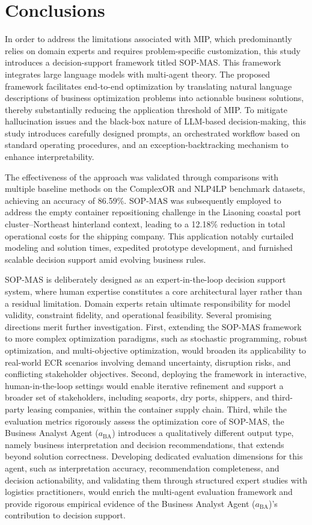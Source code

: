 \documentclass[preprint,12pt]{elsarticle}
\begin{document}
\section{Conclusions}

In order to address the limitations associated with MIP, which predominantly relies on domain experts and requires problem-specific customization, this study introduces a decision-support framework titled SOP-MAS. This framework integrates large language models with multi-agent theory. The proposed framework facilitates end-to-end optimization by translating natural language descriptions of business optimization problems into actionable business solutions, thereby substantially reducing the application threshold of MIP. To mitigate hallucination issues and the black-box nature of LLM-based decision-making, this study introduces carefully designed prompts, an orchestrated workflow based on standard operating procedures, and an exception-backtracking mechanism to enhance interpretability.

The effectiveness of the approach was validated through comparisons with multiple baseline methods on the ComplexOR and NLP4LP benchmark datasets, achieving an accuracy of 86.59\%. SOP-MAS was subsequently employed to address the empty container repositioning challenge in the Liaoning coastal port cluster–Northeast hinterland context, leading to a 12.18\% reduction in total operational costs for the shipping company. This application notably curtailed modeling and solution times, expedited prototype development, and furnished scalable decision support amid evolving business rules.

SOP-MAS is deliberately designed as an expert-in-the-loop decision support system, where human expertise constitutes a core architectural layer rather than a residual limitation. Domain experts retain ultimate responsibility for model validity, constraint fidelity, and operational feasibility. Several promising directions merit further investigation. First, extending the SOP-MAS framework to more complex optimization paradigms, such as stochastic programming, robust optimization, and multi-objective optimization, would broaden its applicability to real-world ECR scenarios involving demand uncertainty, disruption risks, and conflicting stakeholder objectives. Second, deploying the framework in interactive, human-in-the-loop settings would enable iterative refinement and support a broader set of stakeholders, including seaports, dry ports, shippers, and third-party leasing companies, within the container supply chain. Third, while the evaluation metrics rigorously assess the optimization core of SOP-MAS, the Business Analyst Agent ($a_{\text{BA}}$) introduces a qualitatively different output type, namely business interpretation and decision recommendations, that extends beyond solution correctness. Developing dedicated evaluation dimensions for this agent, such as interpretation accuracy, recommendation completeness, and decision actionability, and validating them through structured expert studies with logistics practitioners, would enrich the multi-agent evaluation framework and provide rigorous empirical evidence of the Business Analyst Agent ($a_{\text{BA}}$)'s contribution to decision support.
\end{document}
